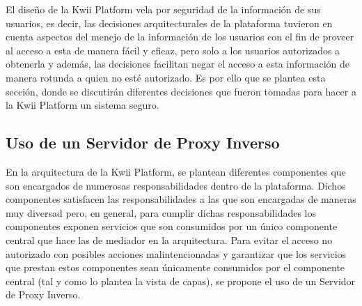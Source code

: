 El diseño de la Kwii Platform vela por seguridad de la información de sus usuarios, es decir, las decisiones arquitecturales de la plataforma tuvieron en cuenta aspectos del menejo de la información de los usuarios con el fin de proveer al acceso a esta de manera fácil y eficaz, pero solo a los usuarios autorizados a obtenerla y además, las decisiones facilitan negar el acceso a esta información de manera rotunda a quien no esté autorizado. Es por ello que se plantea esta sección, donde se discutirán diferentes decisiones que fueron tomadas para hacer a la Kwii Platform un sistema seguro.
\subsection{Uso de un Servidor de Proxy Inverso}
En la arquitectura de la Kwii Platform, se plantean diferentes componentes que son encargados de numerosas responsabilidades dentro de la plataforma. Dichos componentes satisfacen las responsabilidades a las que son encargadas de maneras muy diversad pero, en general, para cumplir dichas responsabilidades los componentes exponen servicios que son consumidos por un único componente central que hace las de mediador en la arquitectura. Para evitar el acceso no autorizado con posibles acciones malintencionadas y garantizar que los servicios que prestan estos componentes sean únicamente consumidos por el componente central (tal y como lo plantea la vista de capas), se propone el uso de un Servidor de Proxy Inverso.
\\\\
